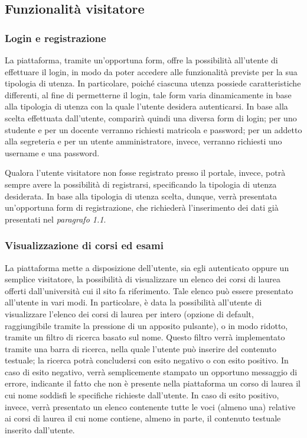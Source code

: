 \documentclass [a4paper,11pt]{book}
\begin{document}
\subsection{Funzionalità visitatore}

\subsubsection{Login e registrazione}

La piattaforma, tramite un'opportuna form, offre la possibilità all'utente di effettuare il login, in modo da poter accedere alle funzionalità previste per la sua tipologia di utenza. In particolare, poiché ciascuna utenza possiede caratteristiche differenti, al fine di permetterne il login, tale form varia dinamicamente in base alla tipologia di utenza con la quale l'utente desidera autenticarsi. In base alla scelta effettuata dall'utente, comparirà quindi una diversa form di login; per uno studente e per un docente verranno richiesti matricola e password; per un addetto alla segreteria e per un utente amministratore, invece, verranno richiesti uno username e una password.

Qualora l'utente visitatore non fosse registrato presso il portale, invece, potrà sempre avere la possibilità di registrarsi, specificando la tipologia di utenza desiderata. In base alla tipologia di utenza scelta, dunque, verrà presentata un'opportuna form di registrazione, che richiederà l'inserimento dei dati già presentati nel \emph{paragrafo 1.1}.

\medskip

\subsubsection{Visualizzazione di corsi ed esami}

La piattaforma mette a disposizione dell'utente, sia egli autenticato oppure un semplice visitatore, la possibilità di visualizzare un elenco dei corsi di laurea offerti dall'università cui il sito fa riferimento. Tale elenco può essere presentato all'utente in vari modi. In particolare, è data la possibilità all'utente di visualizzare l'elenco dei corsi di laurea per intero (opzione di default, raggiungibile tramite la pressione di un apposito pulsante), o in modo ridotto, tramite un filtro di ricerca basato sul nome. Questo filtro verrà implementato tramite una barra di ricerca, nella quale l'utente può inserire del contenuto testuale; la ricerca potrà concludersi con esito negativo o con esito positivo. In caso di esito negativo, verrà semplicemente stampato un opportuno messaggio di errore, indicante il fatto che non è presente nella piattaforma un corso di laurea il cui nome soddisfi le specifiche richieste dall'utente. In caso di esito positivo, invece, verrà presentato un elenco contenente tutte le voci (almeno una) relative ai corsi di laurea il cui nome contiene, almeno in parte, il contenuto testuale inserito dall'utente.
\end{document}
